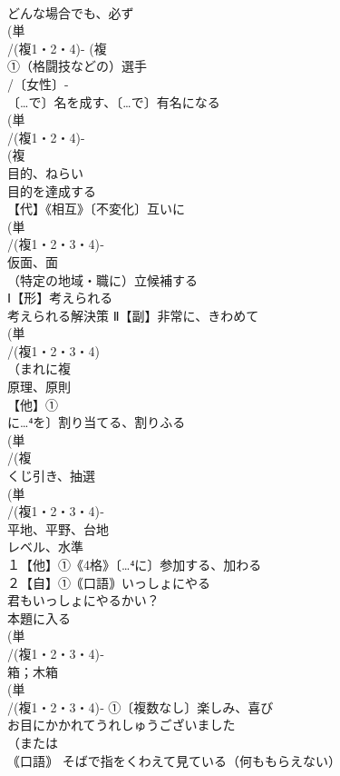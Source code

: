 \documentclass[8pt]{extreport}
\begin{document}
\begin{CJK}{UTF8}{min}
\\	どんな場合でも、必ず
\\	(単
\\	/(複1・2・4)- (複
\\	①（格闘技などの）選手 
\\	/〔女性〕-
\\	〔…で〕名を成す、〔…で〕有名になる
\\	(単
\\	/(複1・2・4)-
\\	(複
\\	目的、ねらい 
\\	目的を達成する
\\	【代】《相互》〔不変化〕互いに
\\	(単
\\	/(複1・2・3・4)‐
\\	仮面、面 
\\	（特定の地域・職に）立候補する
\\	Ⅰ【形】考えられる 
\\	考えられる解決策 Ⅱ【副】非常に、きわめて
\\	(単
\\	/(複1・2・3・4)
\\	（まれに複
\\	原理、原則 
\\	【他】①
\\	に…⁴を〕割り当てる、割りふる
\\	(単
\\	/(複
\\	くじ引き、抽選 
\\	(単
\\	/(複1・2・3・4)‐
\\	平地、平野、台地 
\\	レベル、水準 
\\	１【他】①《4格》〔…⁴に〕参加する、加わる 
\\	２【自】①｟口語｠いっしょにやる 
\\	君もいっしょにやるかい？ 
\\	本題に入る
\\	(単
\\	/(複1・2・3・4)‐
\\	箱；木箱 
\\	(単
\\	/(複1・2・3・4)‐ ①〔複数なし〕楽しみ、喜び 
\\	お目にかかれてうれしゅうございました 
\\	（または
\\	｟口語｠ そばで指をくわえて見ている（何ももらえない） 

\end{CJK}
\end{document}
